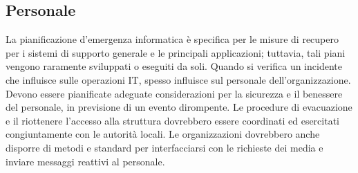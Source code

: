 \documentclass[12pt, a4paper, titlepage]{report}
\begin{document}
		\subsection{Personale} \label{sicPersonale}
			La pianificazione d'emergenza informatica è specifica per le misure di recupero per i sistemi di supporto generale e le principali applicazioni; tuttavia, tali piani vengono raramente sviluppati o eseguiti da soli. Quando si verifica un incidente che influisce sulle operazioni IT, spesso influisce sul personale dell'organizzazione. Devono essere pianificate adeguate considerazioni per la sicurezza e il benessere del personale, in previsione di un evento dirompente. Le procedure di evacuazione e il riottenere l'accesso alla struttura dovrebbero essere coordinati ed esercitati congiuntamente con le autorità locali. Le organizzazioni dovrebbero anche disporre di metodi e standard per interfacciarsi con le richieste dei media e inviare messaggi reattivi al personale. 
			
\end{document}
